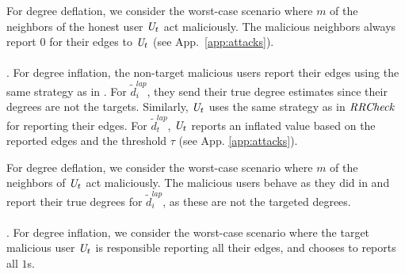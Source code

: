 For degree deflation, we consider the worst-case scenario where $m$ of the neighbors of the honest user $\textit{U}_t$ act maliciously. The malicious neighbors always report $0$ for their edges to $\textit{U}_t$ (see App.~\ref{app:attacks}).
\vspace{-0.2cm}\\\\
\noindent\DegHybrid. %
For degree inflation, the non-target malicious users report their edges using the same strategy as in \DegRRCheck{}. For $\tilde{d}_i^{lap}$, they send their true degree estimates since their degrees are not the targets. Similarly, $\textit{U}_t$ uses the same strategy as in $\textit{RRCheck}{}$ for reporting their edges. For $\tilde{d}_t^{lap}$, $\textit{U}_t$  reports an inflated value based on the reported edges and the threshold $\tau$ (see  App. \ref{app:attacks}).

For degree deflation, we consider the worst-case scenario where $m$ of the neighbors of $\textit{U}_t$ act maliciously. The malicious users behave as they did in \DegRRCheck{} and report their true degrees for $\tilde{d}_i^{lap}$, as these are not the targeted degrees.
\vspace{-0.2cm}\\\\
 \noindent\DegRRNaive. For degree inflation, we consider the worst-case scenario where the target malicious user $\textit{U}_t$ is responsible reporting all their edges, and chooses to reports all $1$s. %

